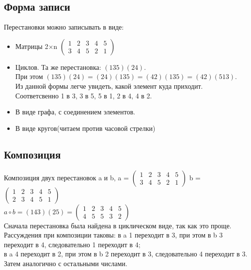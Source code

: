 \documentclass[12pt]{article}
\begin{document}
    \subsection{Форма записи}
    Перестановки можно записывать в виде:
    \begin{itemize}
        \item Матрицы 2$\times$n
              $\begin{pmatrix}
                      1 & 2 & 3 & 4 & 5 \\
                      3 & 4 & 5 & 2 & 1
                  \end{pmatrix}$
        \item Циклов. Та же перестановка:
              $(1 3 5)(2 4)$.\\ При этом $(1 3 5)(2 4) = (2 4)(1 3 5)=
                  (4 2)(1 3 5)=(4 2)(5 1 3)$.\\
              Из данной формы легче увидеть, какой элемент куда приходит. Соответсвенно 1 в 3, 3 в 5, 5 в 1, 2 в 4, 4 в 2.
        \item В виде графа, с соединением элементов.
              
        \item В виде кругов(читаем против часовой стрелки)
              
    \end{itemize}
    \subsection{Композиция}
    Композиция двух перестановок a и b,
    a = $\begin{pmatrix}
    1 & 2 & 3 & 4 & 5 \\
    3 & 4 & 5 & 2 & 1
\end{pmatrix}$
    b = $\begin{pmatrix}
    1 & 2 & 3 & 4 & 5 \\
    2 & 3 & 4 & 5 & 1
\end{pmatrix}$\\
$a \circ b= (1 4 3)(2 5)=
\begin{pmatrix}
    1 & 2 & 3 & 4 & 5 \\
    4 & 5 & 5 & 3 & 2
\end{pmatrix}$\\
Сначала перестановка была найдена в циклическом виде, так как это проще.\\ Рассуждения при композиции таковы: в a 1 переходит в 3, при этом в b 3 переходит в 4, следовательно 1 переходит в 4;\\в a 4 переходит в 2, при этом в b 2 переходит в 3, следовательно 4 переходит в 3. Затем аналогично с остальными числами.
\end{document}

